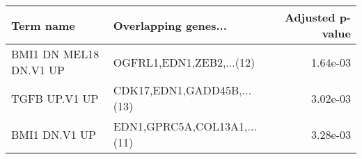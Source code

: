 \begin{tabular}{llr}
\toprule
             Term name &        Overlapping genes... &  Adjusted p-value \\
\midrule
BMI1 DN MEL18 DN.V1 UP &    OGFRL1,EDN1,ZEB2,...(12) &          1.64e-03 \\
         TGFB UP.V1 UP &  CDK17,EDN1,GADD45B,...(13) &          3.02e-03 \\
         BMI1 DN.V1 UP & EDN1,GPRC5A,COL13A1,...(11) &          3.28e-03 \\
\bottomrule
\end{tabular}
